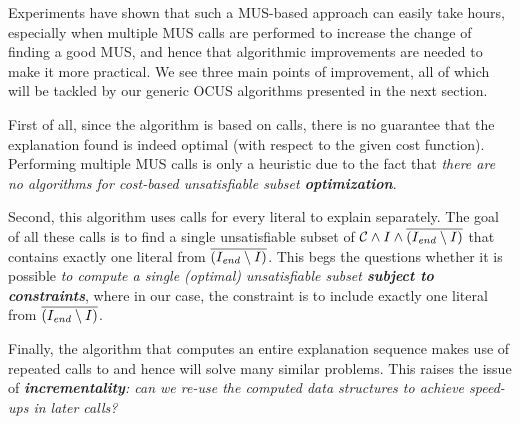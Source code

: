 Experiments have shown that such a MUS-based approach can easily take hours, especially when multiple MUS calls are performed to increase the change of finding a good MUS, and hence that algorithmic improvements are needed to make it more practical. 
We see three main points of improvement, all of which will be tackled by our generic OCUS algorithms presented in the next section. 
\begin{inparaenum}
 \item First of all, since the algorithm is based on  calls, there is no guarantee that the explanation found is indeed optimal %
 (with respect to the given cost function). 
 Performing multiple MUS calls is only a heuristic due to the fact that \textit{there are no algorithms for cost-based unsatisfiable subset \textbf{optimization}}. 
 
 \item Second, this algorithm uses  calls for every literal to explain separately. The goal of all these calls is to find a single unsatisfiable subset of $\mathcal{C}  \land I \land \overline{(I_\mathit{end} \setminus I)}$ that contains exactly one literal from $\overline{(I_\mathit{end} \setminus I)}$. This begs the questions whether it is possible \textit{to compute a single (optimal) unsatisfiable subset \textbf{subject to constraints}}, where in our case, the constraint is to include exactly one literal from $\overline{(I_\mathit{end} \setminus I)}$. 
 \item Finally, the algorithm that computes an entire explanation sequence makes use of repeated calls to \onestep and hence will solve many similar problems. This raises the issue of \textit{\textbf{incrementality}: can we re-use the computed data structures to achieve speed-ups in later calls?}
\end{inparaenum}




